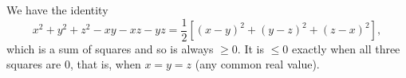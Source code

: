We have the identity
\[
x^2+y^2+z^2-xy-xz-yz=\dfrac{1}{2}\left[(x-y)^2+(y-z)^2+(z-x)^2\right],
\]
which is a sum of squares and so is always $\ge0$. It is $\le0$ exactly when all three squares are $0$, that is, when $\boxed{x=y=z}$ (any common real value).
